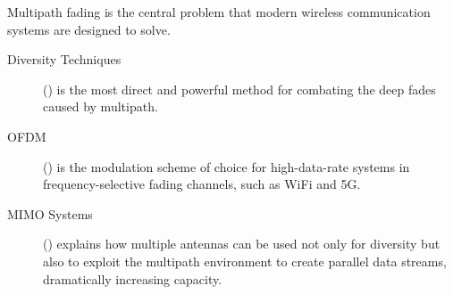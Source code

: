 \begin{importantbox}[title={Further Reading}]
    Multipath fading is the central problem that modern wireless communication systems are designed to solve.
    \begin{description}
        \item[Diversity Techniques] () is the most direct and powerful method for combating the deep fades caused by multipath.
        \item[OFDM] () is the modulation scheme of choice for high-data-rate systems in frequency-selective fading channels, such as WiFi and 5G.
        \item[MIMO Systems] () explains how multiple antennas can be used not only for diversity but also to exploit the multipath environment to create parallel data streams, dramatically increasing capacity.
    \end{description}
\end{importantbox}